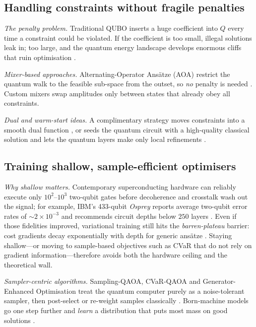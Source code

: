 \subsection{Handling constraints without fragile penalties}

\textit{The penalty problem.}  
Traditional QUBO inserts a huge coefficient into $Q$ every time a
constraint could be violated. If the coefficient is too small, illegal
solutions leak in; too large, and the quantum energy landscape develops
enormous cliffs that ruin optimisation
\cite{kochenberger_unconstrained_2014}.

\textit{Mixer-based approaches.}  
Alternating-Operator Ansätze (AOA) restrict the quantum walk to the
feasible sub-space from the outset, so \emph{no} penalty is needed
\cite{maciejewski_design_2024,fuchs_constrained_2022}.  
Custom mixers swap amplitudes only between states that already obey
all constraints.

\textit{Dual and warm-start ideas.}  
A complimentary strategy moves constraints into a smooth dual function
\cite{gabbassov_lagrangian_2025}, or seeds the quantum circuit with a
high-quality classical solution and lets the quantum layers make only
local refinements \cite{egger_warm-starting_2021}.  


\subsection{Training shallow, sample-efficient optimisers}

\textit{Why shallow matters.}  Contemporary superconducting hardware can
reliably execute only $10^{2}$–$10^{3}$ two-qubit gates before decoherence
and crosstalk wash out the signal; for example, IBM’s 433-qubit
\emph{Osprey} reports average two-qubit error rates of
${\sim}2\times10^{-3}$ and recommends circuit depths below $250$
layers \cite{ibm_heavy_hex_2019,ibm_quantum_volume_2023}.  Even if those
fidelities improved, variational training still hits the
\emph{barren-plateau} barrier: cost gradients decay
exponentially with depth for generic ansätze \cite{cerezo_cost_2021,mcclean_barren_2018}.
Staying shallow—or moving to sample-based objectives such as CVaR that do
not rely on gradient information—therefore avoids both the hardware
ceiling and the theoretical wall.


\textit{Sampler-centric algorithms.}  
Sampling-QAOA, CVaR-QAOA and Generator-Enhanced Optimisation treat the
quantum computer purely as a noise-tolerant sampler, then
post-select or re-weight samples classically
\cite{matsuyama_sampling-based_2025,alcazar_enhancing_2024,barkoutsos_improving_2020}.  
Born-machine models go one step further and \emph{learn} a distribution
that puts most mass on good solutions
\cite{kyriienko_born_2020}.

